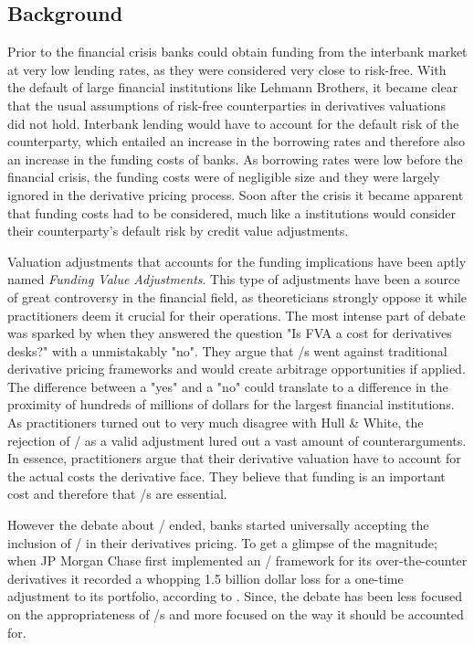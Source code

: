 \documentclass[main.tex]{subfiles}
\begin{document}
    \subsection{Background}
        
    Prior to the financial crisis banks could obtain funding from the interbank market
    at very low lending rates, as they were considered very close to risk-free.
    With the default of large financial institutions like Lehmann Brothers, 
    it became clear that the usual assumptions of risk-free counterparties 
    in derivatives valuations did not hold.
    Interbank lending would have to account for the default risk of the counterparty,
    which entailed an increase in the borrowing rates 
    and therefore also an increase in the funding costs of banks.
    As borrowing rates were low before the financial crisis, 
    the funding costs were of negligible size 
    and they were largely ignored in the derivative pricing process.
    Soon after the crisis it became apparent that funding costs had to be considered,
    much like a institutions would consider their counterparty's default risk by 
    credit value adjustments.

    Valuation adjustments that accounts for the funding implications 
    have been aptly named \textit{Funding Value Adjustments}.
    This type of adjustments have been a source of great controversy in the financial field,
    as theoreticians strongly oppose it while practitioners deem it crucial for their operations.
    The most intense part of debate was sparked by \textcite{HullWhite2012FVA}
    when they answered the question "Is FVA a cost for derivatives desks?" 
    with a unmistakably "no".
    They argue that \FVA/s went against traditional derivative pricing frameworks
    and would create arbitrage opportunities if applied.
    The difference between a "yes" and a "no" could translate to a difference 
    in the proximity of hundreds of millions of dollars for the largest financial institutions.
    As practitioners turned out to very much disagree with Hull \& White,
    the rejection of \FVA/ as a valid adjustment lured out a vast amount of counterarguments.
    In essence, practitioners argue that their derivative valuation 
    have to account for the actual costs the derivative face.
    They believe that funding is an important cost and therefore that \FVA/s are essential.

    However the debate about \FVA/ ended, banks started universally accepting the inclusion of \FVA/
    in their derivatives pricing.
    To get a glimpse of the magnitude; when JP Morgan Chase first implemented an \FVA/ framework
    for its over-the-counter derivatives it recorded a whopping 1.5 billion dollar loss
    for a one-time adjustment to its portfolio, according to \textcite{JPMorganEarnings}.
    Since, the debate has been less focused on the appropriateness of \FVA/s
    and more focused on the way it should be accounted for.
\end{document}
